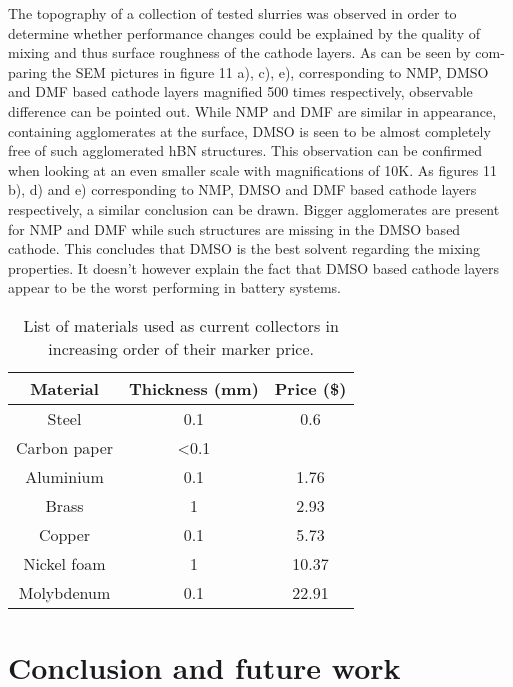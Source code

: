 The topography of a collection of tested slurries was observed in order to determine whether performance changes could be explained by the quality of mixing and thus surface roughness of the cathode layers. As can be seen by com-paring the SEM pictures in figure 11 a), c), e), corresponding to NMP, DMSO and DMF based cathode layers magnified 500 times respectively, observable diﬀerence can be pointed out. While NMP and DMF are similar in appearance, containing agglomerates at the surface, DMSO is seen to be almost completely free of such agglomerated hBN structures. This observation can be confirmed when looking at an even smaller scale with magnifications of 10K. As figures 11 b), d) and e) corresponding to NMP, DMSO and DMF based cathode layers respectively, a similar conclusion can be drawn. Bigger agglomerates are present for NMP and DMF while such structures are missing in the DMSO based cathode.
This concludes that DMSO is the best solvent regarding the mixing properties. It doesn’t however explain the fact that DMSO based cathode layers appear to be the worst performing in battery systems.

\begin{table}
\caption{List of materials used as current collectors in increasing order of their marker price.} \label{t1}
\begin{center}
 \begin{tabular}{|ccc|} 
 \hline
 \textbf{Material} & \textbf{Thickness (mm)} & \textbf{Price (\$)} \\
 \hline
Steel & 0.1 & 0.6 \\ 
Carbon paper  & <0.1 &  \\
Aluminium & 0.1 & 1.76 \\
Brass & 1 & 2.93 \\
Copper & 0.1 & 5.73 \\ 
Nickel foam & 1 & 10.37 \\
Molybdenum & 0.1 & 22.91 \\
 \hline
\end{tabular}
\end{center}
\end{table}

\section{Conclusion and future work}